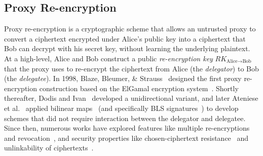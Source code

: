 

\subsection{Proxy Re-encryption}
%
%
Proxy re-encryption is a cryptographic scheme that allows an untrusted
proxy to convert a ciphertext encrypted under Alice's public key into a
ciphertext that Bob can decrypt with his secret key, without learning the
underlying plaintext.
%
At a high-level, Alice and Bob construct a public \emph{re-encryption key}
$RK_{\text{Alice}\rightarrow\text{Bob}}$ that
the proxy uses to re-encrypt the ciphertext from Alice (the \emph{delegator}) to Bob
(the \emph{delegatee}).
%
In 1998, Blaze, Bleumer, \& Strauss~\cite{98-eurocrypt-proxy_cryptography}
designed the first proxy re-encryption construction based on the ElGamal
encryption system~\cite{85-toit-elgamal}.
%
Shortly thereafter, Dodis and Ivan~\cite{03-ndss-proxy_cryptography_revisited}
developed a unidirectional variant, and later Ateniese et
al.~\cite{05-ndss-improved_proxy_reencryption} applied bilinear
maps~\cite{01-crypto-ibe_weil_pairing} (and specifically BLS
signatures~\cite{03-eurocrypt-aggregate_signatures_bilinear_maps}) to develop
schemes that did not require interaction between the delegator and delegatee.
%
Since then, numerous works have explored features like multiple
re-encryptions~\cite{17-tops-fast_proxy_re_encryption} and
revocation~\cite{12-crypto-dynamic_credentials_and_delegation_for_abe}, and
security properties like chosen-ciphertext
resistance~\cite{07-ccs-cca_proxy_re_encryption} and
unlinkability of ciphertexts~\cite{19-acisp-pcs_proxy_reencryption}.



